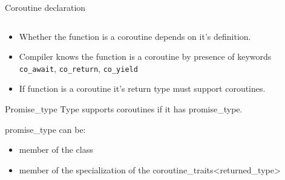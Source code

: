 \documentclass[10pt]{beamer}
\begin{document}
\begin{frame}{Coroutine declaration}
  \vfill
  \begin{center}
  \begin{minipage}{0.8\linewidth}
  \inputminted{c++}{code-examples/intro/declaration.hpp}
  \end{minipage}
  \end{center}
  \vfill

  \begin{itemize}[<+->]
  	\item Whether the function is a coroutine depends on \alert{it's definition}.
  	\item Compiler knows the function is a coroutine by presence of keywords {\alert{\texttt{co\_await}}, \alert{\texttt{co\_return}}, \alert{\texttt{co\_yield}}}
  	\item If function is a coroutine it's \alert{return type must support coroutines}.
  \end{itemize}
  
\end{frame}

\begin{frame}{Promise\_type}
	Type supports coroutines \alert{if it has promise\_type}.
	\vfill

	promise\_type can be:
	\begin{itemize}[<+-|alert@+>]
		\item member of the class
		\item member of the specialization of the coroutine\_traits<returned\_type>
	\end{itemize}
\end{frame}
\end{document}
